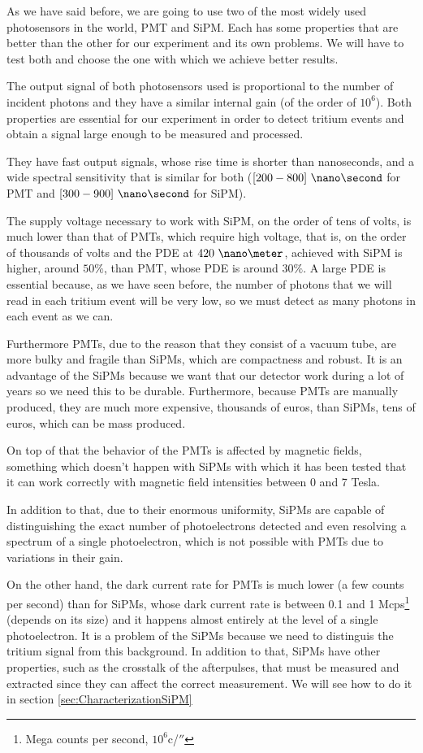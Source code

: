 As we have said before, we are going to use two of the most widely used photosensors in the world, PMT and SiPM. Each has some properties that are better than the other for our experiment and its own problems. We will have to test both and choose the one with which we achieve better results.

The output signal of both photosensors used is proportional to the number of incident photons and they have a similar internal gain (of the order of $10^6$). Both properties are essential for our experiment in order to detect tritium events and obtain a signal large enough to be measured and processed. 

They have fast output signals, whose rise time is shorter than nanoseconds, and a wide spectral sensitivity that is similar for both ($[200-800]~\nano\second$ for PMT and $[300-900]~\nano\second$ for SiPM).

The supply voltage necessary to work with SiPM, on the order of tens of volts, is much lower than that of PMTs, which require high voltage, that is, on the order of thousands of volts and the PDE at $420~\nano\meter$,  achieved with SiPM is higher, around $50\%$, than PMT, whose PDE is around $30\%$. A large PDE is essential because, as we have seen before, the number of photons that we will read in each tritium event will be very low, so we must detect as many photons in each event as we can.

Furthermore PMTs, due to the reason that they consist of a vacuum tube, are more bulky and fragile than SiPMs, which are compactness and robust. It is an advantage of the SiPMs because we want that our detector work during a lot of years so we need this to be durable. Furthermore, because PMTs are manually produced, they are much more expensive, thousands of euros, than SiPMs, tens of euros, which can be mass produced.

On top of that the behavior of the PMTs is affected by magnetic fields, something which doesn't happen with SiPMs with which it has been tested that it can work correctly with magnetic field intensities between 0 and 7 Tesla. 

In addition to that, due to their enormous uniformity, SiPMs are capable of distinguishing the exact number of photoelectrons detected and even resolving a spectrum of a single photoelectron, which is not possible with PMTs due to variations in their gain.

On the other hand, the dark current rate for PMTs is much lower (a few counts per second) than for SiPMs, whose dark current rate is between 0.1 and 1 Mcps\footnote{Mega counts per second, $10^6$c/$\second$} (depends on its size) and it happens almost entirely at the level of a single photoelectron. It is a problem of the SiPMs because we need to distinguis the tritium signal from this background. In addition to that, SiPMs have other properties, such as the crosstalk of the afterpulses, that must be measured and extracted since they can affect the correct measurement. We will see how to do it in section \ref{sec:CharacterizationSiPM}

